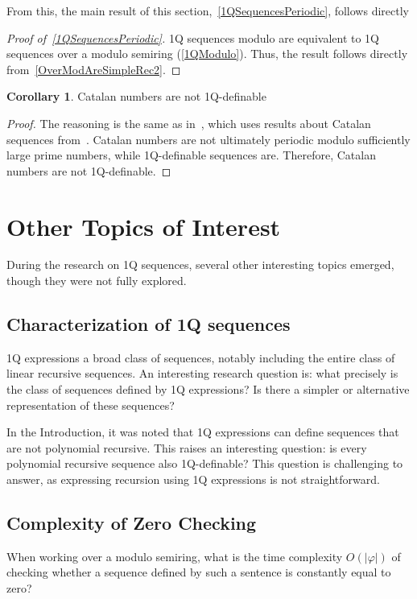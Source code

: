 \documentclass[12pt]{article}
\theoremstyle{definition}
\newtheorem{corollary}{Corollary}[section]
\begin{document}
From this, the main result of this section,~\cref{1QSequencesPeriodic}, follows directly

\begin{proof}[Proof of~\cref{1QSequencesPeriodic}]
    1Q sequences modulo are equivalent to 1Q sequences over a modulo semiring (\cref{1QModulo}). Thus, the result follows directly from~\cref{OverModAreSimpleRec2}.
\end{proof}

\begin{corollary}
    Catalan numbers are not 1Q-definable
\end{corollary}

\begin{proof}
    The reasoning is the same as in~\cite[Theorem 7, Corollary 8]{CadilhacMPPS20}, which uses results about Catalan sequences from~\cite{KubotaCatalan}. Catalan numbers are not ultimately periodic modulo sufficiently large prime numbers, while 1Q-definable sequences are. Therefore, Catalan numbers are not 1Q-definable.
\end{proof}

\section{Other Topics of Interest}
\label{SecOther}
During the research on 1Q sequences, several other interesting topics emerged, though they were not fully explored.

\subsection*{Characterization of 1Q sequences}
\label{CharacterizationOf1QSequences}
1Q expressions a broad class of sequences, notably including the entire class of linear recursive sequences. An interesting research question is: what precisely is the class of sequences defined by 1Q expressions? Is there a simpler or alternative representation of these sequences?

In the Introduction, it was noted that 1Q expressions can define sequences that are not polynomial recursive. This raises an interesting question: is every polynomial recursive sequence also 1Q-definable? This question is challenging to answer, as expressing recursion using 1Q expressions is not straightforward.

\subsection*{Complexity of Zero Checking}
When working over a modulo semiring, what is the time complexity $O(|\varphi|)$ of checking whether a sequence defined by such a sentence is constantly equal to zero?
\end{document}
